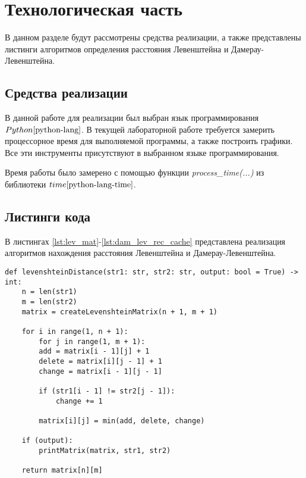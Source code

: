 \chapter{Технологическая часть}

В данном разделе будут рассмотрены средства реализации, а также представлены листинги алгоритмов определения расстояния Левенштейна и Дамерау-Левенштейна.

\section{Средства реализации}
В данной работе для реализации был выбран язык программирования $Python \cite{python-lang}$. В текущей лабораторной работе требуется замерить процессорное время для выполняемой программы, а также построить графики. Все эти инструменты присутствуют в выбранном языке программирования.

Время работы было замерено с помощью функции \textit{process\_time(...)} из библиотеки $time \cite{python-lang-time}$.


\section{Листинги кода}

В листингах \ref{lst:lev_mat}-\ref{lst:dam_lev_rec_cache} представлена реализация алгоритмов нахождения расстояния Левенштейна и Дамерау-Левенштейна.

\clearpage

\begin{center}
    \captionsetup{justification=raggedright,singlelinecheck=off}
    \begin{lstlisting}[label=lst:lev_mat,caption=Алгоритм нахождения расстояния Левенштейна (матричный)]
def levenshteinDistance(str1: str, str2: str, output: bool = True) -> int:
	n = len(str1)
	m = len(str2)
	matrix = createLevenshteinMatrix(n + 1, m + 1)
	
	for i in range(1, n + 1):
		for j in range(1, m + 1):
		add = matrix[i - 1][j] + 1
		delete = matrix[i][j - 1] + 1
		change = matrix[i - 1][j - 1]
		
		if (str1[i - 1] != str2[j - 1]):
			change += 1
		
		matrix[i][j] = min(add, delete, change)
	
	if (output):
		printMatrix(matrix, str1, str2)
	
	return matrix[n][m]
\end{lstlisting}
\end{center}


